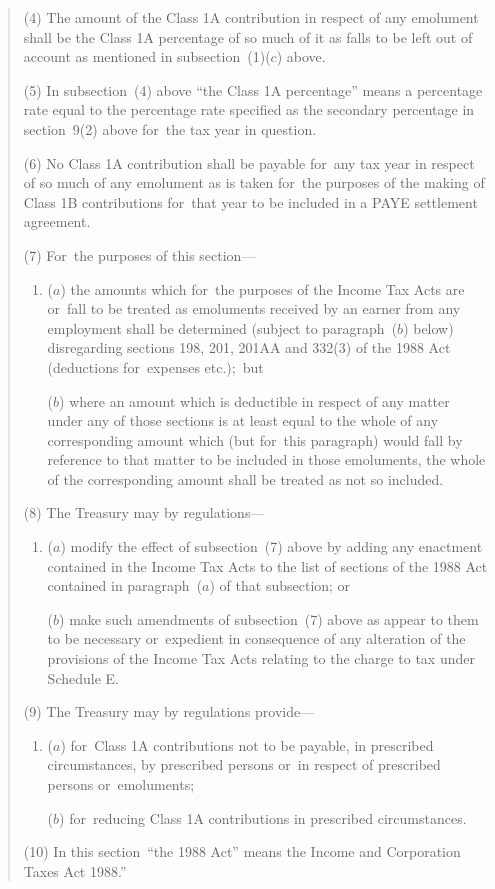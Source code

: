 \documentclass[12pt,a4paper]{article}
\begin{document}
\begin{quotation}
(4) The amount of the Class 1A contribution in respect of any emolument shall be the Class 1A percentage of so much of it as falls to be left out of account as mentioned in subsection~(1)($c$)  above.

(5) In subsection~(4)  above “the Class 1A percentage” means a percentage rate equal to the percentage rate specified as the secondary percentage in section~9(2)  above for~the tax year in question.

(6) No Class 1A contribution shall be payable for~any tax year in respect of so much of any emolument as is taken for~the purposes of the making of Class 1B contributions for~that year to be included in a PAYE settlement agreement.

(7) For~the purposes of this section—
\begin{enumerate}\item[]
($a$) the amounts which for~the purposes of the Income Tax Acts are or~fall to be treated as emoluments received by an earner from any employment shall be determined (subject to paragraph~($b$)  below) disregarding sections 198, 201, 201AA and 332(3)  of the 1988 Act (deductions for~expenses etc.);\ but

($b$) where an amount which is deductible in respect of any matter under any of those sections is at least equal to the whole of any corresponding amount which (but for~this paragraph) would fall by reference to that matter to be included in those emoluments, the whole of the corresponding amount shall be treated as not so included.
\end{enumerate}

(8) The Treasury may by regulations—
\begin{enumerate}\item[]
($a$) modify the effect of subsection~(7)  above by adding any enactment contained in the Income Tax Acts to the list of sections of the 1988 Act contained in paragraph~($a$)  of that subsection; or

($b$) make such amendments of subsection~(7)  above as appear to them to be necessary or~expedient in consequence of any alteration of the provisions of the Income Tax Acts relating to the charge to tax under Schedule E.
\end{enumerate}

(9) The Treasury may by regulations provide—
\begin{enumerate}\item[]
($a$) for~Class 1A contributions not to be payable, in prescribed circumstances, by prescribed persons or~in respect of prescribed persons or~emoluments;

($b$) for~reducing Class 1A contributions in prescribed circumstances.
\end{enumerate}

(10) In this section~“the 1988 Act” means the Income and Corporation Taxes Act 1988.”
\end{quotation}
\end{document}

